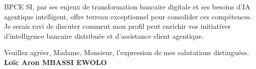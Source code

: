 \documentclass[a4paper,11pt]{article}
\begin{document}
\vspace{0.8em}
\noindent BPCE SI, par ses enjeux de transformation bancaire digitale et ses besoins d'IA agentique intelligent, offre terreau exceptionnel pour consolider ces compétences. Je serais ravi de discuter comment mon profil peut enrichir vos initiatives d'intelligence bancaire distribuée et d'assistance client agentique.

\vspace{1.5em}
\noindent Veuillez agr\'eer, Madame, Monsieur, l'expression de mes salutations distingu\'ees.
\vspace{2em}
\noindent \textbf{Lo\"ic Aron MBASSI EWOLO}
\end{document}
